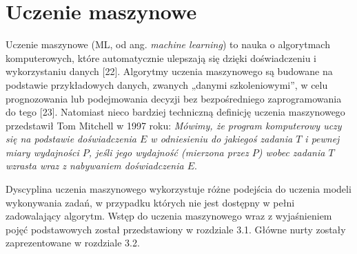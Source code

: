 %		
%
%
%
%

\chapter{Uczenie maszynowe}
\label{cha:cha3}

Uczenie maszynowe (ML, od ang. \textit{machine learning}) to nauka o algorytmach komputerowych, które automatycznie ulepszają się dzięki doświadczeniu i wykorzystaniu danych [22]. Algorytmy uczenia maszynowego są budowane na podstawie przykładowych danych, zwanych „danymi szkoleniowymi”, w celu prognozowania lub podejmowania decyzji bez bezpośredniego zaprogramowania do tego [23]. Natomiast nieco bardziej techniczną definicję uczenia maszynowego przedstawił Tom Mitchell w 1997 roku: \textit{Mówimy, że program komputerowy uczy się na podstawie doświadczenia $E$ w odniesieniu do jakiegoś zadania $T$ i pewnej miary wydajności $P$, jeśli jego wydajność (mierzona przez $P$) wobec zadania $T$ wzrasta wraz z nabywaniem doświadczenia $E$}.

Dyscyplina uczenia maszynowego wykorzystuje różne podejścia do uczenia modeli wykonywania zadań, w przypadku których nie jest dostępny w pełni zadowalający algorytm. Wstęp do uczenia maszynowego wraz z wyjaśnieniem pojęć podstawowych został przedstawiony w rozdziale 3.1. Główne nurty zostały zaprezentowane w rozdziale 3.2.

